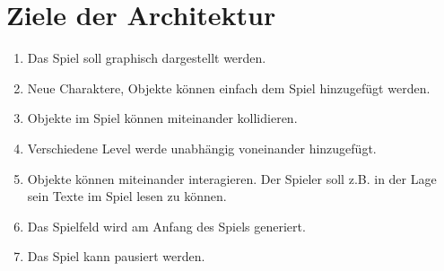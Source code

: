 \chapter{Ziele der Architektur}


\begin{enumerate}
    \item Das Spiel soll graphisch dargestellt werden.
    \item Neue Charaktere, Objekte können einfach dem Spiel hinzugefügt werden.
    \item Objekte im Spiel können miteinander kollidieren.
    \item Verschiedene Level werde unabhängig voneinander hinzugefügt.
    \item Objekte können miteinander interagieren. 
        Der Spieler soll z.B. in der Lage sein Texte im Spiel lesen zu können.
    \item Das Spielfeld wird am Anfang des Spiels generiert.
    \item Das Spiel kann pausiert werden.
\end{enumerate}
        
